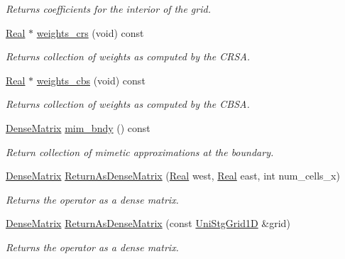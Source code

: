 \begin{DoxyCompactItemize}
\begin{DoxyCompactList}\small\item\em Returns coefficients for the interior of the grid. \end{DoxyCompactList}\item 
\hyperlink{group__c01-roots_gac080bbbf5cbb5502c9f00405f894857d}{Real} $\ast$ \hyperlink{classmtk_1_1Grad1D_ae5f15d8986a5680b6a1c120283c6cc5e}{weights\-\_\-crs} (void) const 
\begin{DoxyCompactList}\small\item\em Returns collection of weights as computed by the C\-R\-S\-A. \end{DoxyCompactList}\item 
\hyperlink{group__c01-roots_gac080bbbf5cbb5502c9f00405f894857d}{Real} $\ast$ \hyperlink{classmtk_1_1Grad1D_ad11927d8f9f1ca0089aaa2be7094f7f3}{weights\-\_\-cbs} (void) const 
\begin{DoxyCompactList}\small\item\em Returns collection of weights as computed by the C\-B\-S\-A. \end{DoxyCompactList}\item 
\hyperlink{classmtk_1_1DenseMatrix}{Dense\-Matrix} \hyperlink{classmtk_1_1Grad1D_ab25e1d064a5a00fbe3777e65fd5750c0}{mim\-\_\-bndy} () const 
\begin{DoxyCompactList}\small\item\em Return collection of mimetic approximations at the boundary. \end{DoxyCompactList}\item 
\hyperlink{classmtk_1_1DenseMatrix}{Dense\-Matrix} \hyperlink{classmtk_1_1Grad1D_a4218516bfb43f683559322ea97058c78}{Return\-As\-Dense\-Matrix} (\hyperlink{group__c01-roots_gac080bbbf5cbb5502c9f00405f894857d}{Real} west, \hyperlink{group__c01-roots_gac080bbbf5cbb5502c9f00405f894857d}{Real} east, int num\-\_\-cells\-\_\-x)
\begin{DoxyCompactList}\small\item\em Returns the operator as a dense matrix. \end{DoxyCompactList}\item 
\hyperlink{classmtk_1_1DenseMatrix}{Dense\-Matrix} \hyperlink{classmtk_1_1Grad1D_a75781c4455569a7934d4e0dff7e06064}{Return\-As\-Dense\-Matrix} (const \hyperlink{classmtk_1_1UniStgGrid1D}{Uni\-Stg\-Grid1\-D} \&grid)
\begin{DoxyCompactList}\small\item\em Returns the operator as a dense matrix. \end{DoxyCompactList}\end{DoxyCompactItemize}
